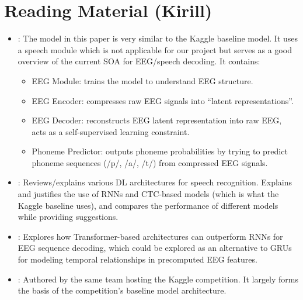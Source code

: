 \documentclass[12pt,a4paper]{article}
\begin{document}
\section{Reading Material (Kirill)}
\begin{itemize}
    \item \citet{lee_enhancing_2025}: The model in this paper is very similar to the Kaggle baseline model. It uses a speech module which is not applicable for our project but serves as a good overview of the current SOA for EEG/speech decoding. It contains:
    \begin{itemize}
        \item EEG Module: trains the model to understand EEG structure.
        \item EEG Encoder: compresses raw EEG signals into ``latent representations''.
        \item EEG Decoder: reconstructs EEG latent representation into raw EEG, acts as a self-supervised learning constraint.
        \item Phoneme Predictor: outputs phoneme probabilities by trying to predict phoneme sequences (/p/, /a/, /t/) from compressed EEG signals.
    \end{itemize}
    \item \citet{papastratis_speech_2021}: Reviews/explains various DL architectures for speech recognition. Explains and justifies the use of RNNs and CTC-based models (which is what the Kaggle baseline uses), and compares the performance of different models while providing suggestions.
    \item \citet{lee_eeg-transformer_2021}: Explores how Transformer-based architectures can outperform RNNs for EEG sequence decoding, which could be explored as an alternative to GRUs for modeling temporal relationships in precomputed EEG features.
    \item \citet{card_accurate_2024}: Authored by the same team hosting the Kaggle competition. It largely forms the basis of the competition's baseline model architecture.
\end{itemize}
\end{document}
